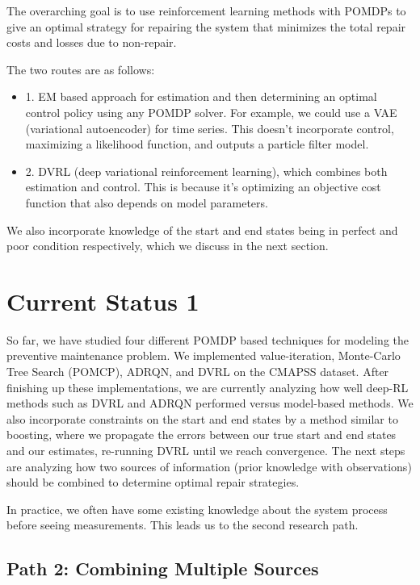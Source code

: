 \documentclass[english]{article}
\numberwithin{equation}{section}
\begin{document}
The overarching goal is to use reinforcement learning methods with POMDPs to give an optimal strategy for repairing the system that minimizes the total repair costs and losses due to non-repair.

The two routes are as follows:
\begin{itemize}
	\item 1. EM based approach for estimation and then determining an optimal control policy using any POMDP solver. For example, we could use a VAE (variational autoencoder) for time series. This doesn't incorporate control, maximizing a likelihood function, and outputs a particle filter model.
	\item 2. DVRL (deep variational reinforcement learning), which combines both estimation and control. This is because it's optimizing an objective cost function that also depends on model parameters.
\end{itemize}

We also incorporate knowledge of the start and end states being in perfect and poor condition respectively, which we discuss in the next section.

\section*{Current Status 1}

So far, we have studied four different POMDP based techniques for modeling the preventive maintenance problem. We implemented value-iteration, Monte-Carlo Tree Search (POMCP), ADRQN, and DVRL on the CMAPSS dataset. After finishing up these implementations, we are currently analyzing how well deep-RL methods such as DVRL and ADRQN performed versus model-based methods. We also incorporate constraints on the start and end states by a method similar to boosting, where we propagate the errors between our true start and end states and our estimates, re-running DVRL until we reach convergence. The next steps are analyzing how two sources of information (prior knowledge with observations) should be combined to determine optimal repair strategies.

In practice, we often have some existing knowledge about the system process before seeing measurements. This leads us to the second research path.

\subsection*{Path 2: Combining Multiple Sources}
\end{document}
